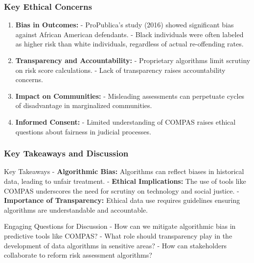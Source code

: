 \documentclass[aspectratio=169]{beamer}
\begin{document}
\begin{frame}[fragile]
    \frametitle{Key Ethical Concerns}
    \begin{enumerate}
        \item \textbf{Bias in Outcomes:}
            - ProPublica's study (2016) showed significant bias against African American defendants.
            - Black individuals were often labeled as higher risk than white individuals, regardless of actual re-offending rates.

        \item \textbf{Transparency and Accountability:}
            - Proprietary algorithms limit scrutiny on risk score calculations.
            - Lack of transparency raises accountability concerns.

        \item \textbf{Impact on Communities:}
            - Misleading assessments can perpetuate cycles of disadvantage in marginalized communities.

        \item \textbf{Informed Consent:}
            - Limited understanding of COMPAS raises ethical questions about fairness in judicial processes.
    \end{enumerate}
\end{frame}

\begin{frame}[fragile]
    \frametitle{Key Takeaways and Discussion}
    \begin{block}{Key Takeaways}
        - \textbf{Algorithmic Bias:} Algorithms can reflect biases in historical data, leading to unfair treatment.
        - \textbf{Ethical Implications:} The use of tools like COMPAS underscores the need for scrutiny on technology and social justice.
        - \textbf{Importance of Transparency:} Ethical data use requires guidelines ensuring algorithms are understandable and accountable.
    \end{block}

    \begin{block}{Engaging Questions for Discussion}
        - How can we mitigate algorithmic bias in predictive tools like COMPAS?
        - What role should transparency play in the development of data algorithms in sensitive areas?
        - How can stakeholders collaborate to reform risk assessment algorithms?
    \end{block}
\end{frame}
\end{document}
